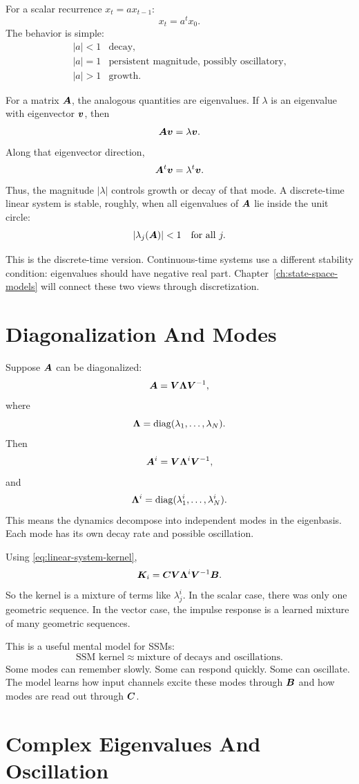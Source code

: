 For a scalar recurrence $x_t = a x_{t-1}$:
\[
  x_t = a^t x_0.
\]
The behavior is simple:
\[
\begin{array}{ll}
|a| < 1 & \text{decay}, \\
|a| = 1 & \text{persistent magnitude, possibly oscillatory}, \\
|a| > 1 & \text{growth}.
\end{array}
\]

For a matrix $\bm{A}$, the analogous quantities are eigenvalues. If $\lambda$ is an
eigenvalue with eigenvector $\bm{v}$, then
\[
  \bm{A} \bm{v} = \lambda \bm{v}.
\]
Along that eigenvector direction,
\[
  \bm{A}^t \bm{v} = \lambda^t \bm{v}.
\]
Thus, the magnitude $|\lambda|$ controls growth or decay of that mode. A discrete-time
linear system is stable, roughly, when all eigenvalues of $\bm{A}$ lie inside the unit circle:
\[
  |\lambda_j(\bm{A})| < 1
  \quad \text{for all } j.
\]

This is the discrete-time version. Continuous-time systems use a different stability
condition: eigenvalues should have negative real part. Chapter~\ref{ch:state-space-models}
will connect these two views through discretization.

\section{Diagonalization And Modes}

Suppose $\bm{A}$ can be diagonalized:
\[
  \bm{A} = \bm{V} \bm{\Lambda} \bm{V}^{-1},
\]
where
\[
  \bm{\Lambda} = \operatorname{diag}(\lambda_1,\ldots,\lambda_N).
\]
Then
\[
  \bm{A}^i = \bm{V} \bm{\Lambda}^i \bm{V}^{-1},
\]
and
\[
  \bm{\Lambda}^i = \operatorname{diag}(\lambda_1^i,\ldots,\lambda_N^i).
\]
This means the dynamics decompose into independent modes in the eigenbasis. Each mode
has its own decay rate and possible oscillation.

Using \eqref{eq:linear-system-kernel},
\[
  \bm{K}_i
  =
  \bm{C} \bm{V} \bm{\Lambda}^i \bm{V}^{-1} \bm{B}.
\]
So the kernel is a mixture of terms like $\lambda_j^i$. In the scalar case, there was
only one geometric sequence. In the vector case, the impulse response is a learned mixture
of many geometric sequences.

This is a useful mental model for SSMs:
\[
  \text{SSM kernel} \approx \text{mixture of decays and oscillations}.
\]
Some modes can remember slowly. Some can respond quickly. Some can oscillate. The model
learns how input channels excite these modes through $\bm{B}$ and how modes are read out
through $\bm{C}$.

\section{Complex Eigenvalues And Oscillation}

